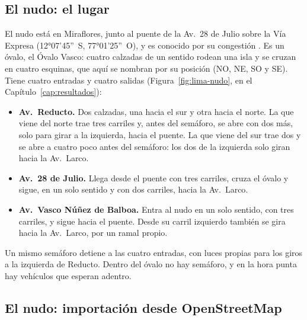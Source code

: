 \subsection*{El nudo: el lugar}

El nudo está en Miraflores, junto al puente de la Av.~28 de Julio sobre
la Vía Expresa (12°07'45''~S, 77°01'25''~O), y es conocido por su
congestión \citep{Pereyra2025_Reducto}. Es un óvalo, el Óvalo Vasco:
cuatro calzadas de un sentido rodean una isla y se cruzan en cuatro
esquinas, que aquí se nombran por su posición (NO, NE, SO y SE). Tiene
cuatro entradas y cuatro salidas (Figura~\ref{fig:lima-nudo}, en el
Capítulo~\ref{cap:resultados}):
\begin{itemize}
  \item \textbf{Av.~Reducto.} Dos calzadas, una hacia el sur y otra
    hacia el norte. La que viene del norte trae tres carriles y, antes
    del semáforo, se abre con dos más, solo para girar a la izquierda,
    hacia el puente. La que viene del sur trae dos y se abre a cuatro
    poco antes del semáforo: los dos de la izquierda solo giran hacia la
    Av.~Larco.
  \item \textbf{Av.~28 de Julio.} Llega desde el puente con tres
    carriles, cruza el óvalo y sigue, en un solo sentido y con dos
    carriles, hacia la Av.~Larco.
  \item \textbf{Av.~Vasco Núñez de Balboa.} Entra al nudo en un solo
    sentido, con tres carriles, y sigue hacia el puente. Desde su carril
    izquierdo también se gira hacia la Av.~Larco, por un ramal propio.
\end{itemize}
Un mismo semáforo detiene a las cuatro entradas, con luces propias para
los giros a la izquierda de Reducto. Dentro del óvalo no hay semáforo,
y en la hora punta hay vehículos que esperan adentro.

\subsection*{El nudo: importación desde OpenStreetMap}

